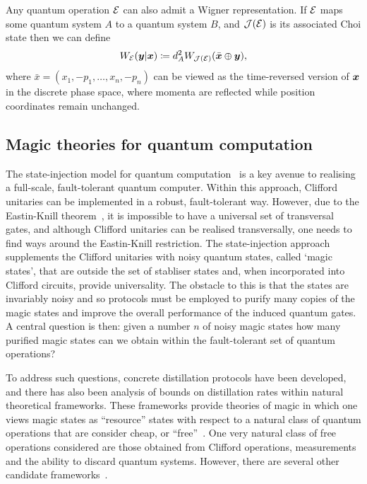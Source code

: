 \documentclass[pra,
aps,
twocolumn,
superscriptaddress,
groupedaddress,
nofootinbib,
reprint
]{revtex4-1}
\begin{document}
Any quantum operation $\mathcal{E}$ can also admit a Wigner representation. If $\mathcal{E}$ maps some quantum system $A$ to a quantum system $B$, and $\mathcal{J}(\mathcal{E})$ is its associated Choi state then we can define
\begin{equation}
W_{\mathcal{E}}(\boldsymbol{y} |\boldsymbol{x}) \coloneqq d_A^2 W_{\mathcal{J}(\mathcal{E})}(\bar{\boldsymbol{x}} \oplus \boldsymbol{y}),
\end{equation}
where $\bar{x} =(x_1, -p_1, \dots , x_n, -p_n)$ can be viewed as the time-reversed version of $\boldsymbol{x}$ in the discrete phase space, where momenta are reflected while position coordinates remain unchanged.

\subsection{Magic theories for quantum computation}
\label{sec:mono}

The state-injection model for quantum computation~\cite{cit:bravyi} is a key avenue to realising a full-scale, fault-tolerant quantum computer. Within this approach, Clifford unitaries can be implemented in a robust, fault-tolerant way. However, due to the Eastin-Knill theorem~\cite{Eastin_2009}, it is impossible to have a universal set of transversal gates, and although Clifford unitaries can be realised transversally, one needs to find ways around the Eastin-Knill restriction. The state-injection approach supplements the Clifford unitaries with noisy quantum states, called `magic states', that are outside the set of stabliser states and, when incorporated into Clifford circuits, provide universality. The obstacle to this is that the states are invariably noisy and so protocols must be employed to purify many copies of the magic states and improve the overall performance of the induced quantum gates. A central question is then: given a number $n$ of noisy magic states how many purified magic states can we obtain within the fault-tolerant set of quantum operations?

To address such questions, concrete distillation protocols have been developed, and there has also been analysis of bounds on distillation rates within natural theoretical frameworks. These frameworks provide theories of magic in which one views magic states as ``resource'' states with respect to a natural class of quantum operations that are consider cheap, or ``free''~\cite{Gour_2019}. One very natural class of free operations considered are those obtained from Clifford operations, measurements and the ability to discard quantum systems. However, there are several other candidate frameworks~\cite{cit:ahmadi, cit:seddon, Wang_2019}.
\end{document}
